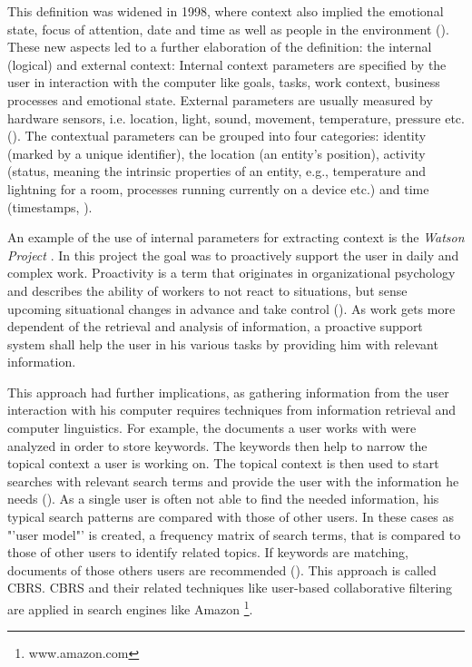 This definition was widened in 1998, where context also implied the emotional state, focus of attention, date and time as well as people in the environment (\cite{dey1998context}). These new aspects led to a further elaboration of the definition: the internal (logical) and external context: Internal context parameters are specified by the user in interaction with the computer like goals, tasks, work context, business processes and emotional state. External parameters are usually measured by hardware sensors, i.e. location, light, sound, movement, temperature, pressure etc. (\cite{hofer2003context}). The contextual parameters can be grouped into four categories: identity (marked by a unique identifier), the location (an entity’s position), activity (status, meaning the intrinsic properties of an entity, e.g., temperature and lightning for a room, processes running currently on a device etc.) and time (timestamps, \cite{dey2001conceptual}). 

An example of the use of internal parameters for extracting context is the \textit{Watson Project} \cite{budzik2000user} . In this project the goal was to proactively support the user in daily and complex work. Proactivity is a term that  originates in organizational psychology and describes the ability of workers to not react to situations, but sense upcoming situational changes in advance and take control (\cite{grant2008dynamics}). As work gets more dependent of the retrieval and analysis of information, a proactive support system shall help the user in his various tasks by providing him with relevant information. 

This approach had further implications, as gathering information from the user interaction with his computer requires techniques from information retrieval and computer linguistics. For example, the documents a user works with were analyzed in order to store keywords. The keywords then help to narrow the topical context a user is working on. The topical context is then used to start searches with relevant search terms and provide the user with the information he needs (\cite{budzik2000user}). As a single user is often not able to find the needed information, his typical search patterns are compared with those of other users. In these cases as "'user model"' is created, a frequency matrix of search terms, that is compared to those of other users to identify related topics. If keywords are matching, documents of those others users are recommended (\cite{anand2007contextual}). This approach is called \ac{CBRS}. \acs{CBRS} and their related techniques like user-based collaborative filtering are applied in search engines like Amazon \footnote{www.amazon.com}.

